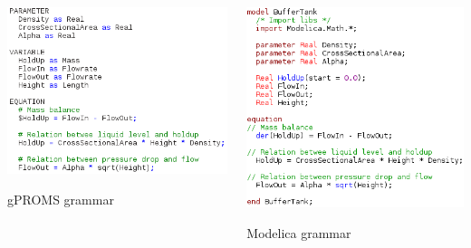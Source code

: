 \documentclass[compress,newPxFont,sthlmFooter]{beamer}
\begin{document}
\begin{frame}[plain]
    \begin{columns}[b]
      \begin{column}{0.5\paperwidth}
        \begin{center}
           \includegraphics[align=c, width=0.35\paperwidth]{gproms_model.png} \par
           {\scriptsize \textcolor{sthlmRed}{gPROMS grammar}}
        \end{center}
      \end{column}
      \begin{column}{0.5\paperwidth}
        \begin{center}
           \includegraphics[align=c, width=0.35\paperwidth]{modelica_model.png} \par
           {\scriptsize \textcolor{sthlmRed}{Modelica grammar}} 
        \end{center}
      \end{column}
    \end{columns}
\end{frame}
\end{document}
